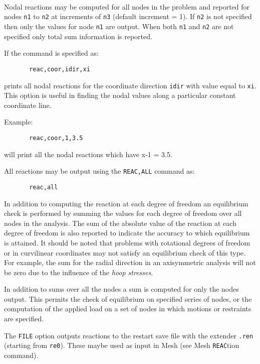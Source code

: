  \\{\smallskip}
 \\{\smallskip}
 \\{\smallskip}
\headb

Nodal reactions may be computed for all nodes in the
problem and reported for nodes {\tt n1} to {\tt n2} at increments
of {\tt n3} (default increment = 1).  If {\tt n2} is not specified then only
the values for node {\tt n1} are output.  When both {\tt n1} and {\tt n2}
are not specified only total sum information is reported.

If the command is specified as:
\begin{verbatim}
       reac,coor,idir,xi
\end{verbatim}
prints all nodal reactions for the coordinate direction
{\tt idir} with value equal to {\tt xi}.
This option is useful in finding the nodal values along a particular
constant coordinate line.

Example:
\begin{verbatim}
       reac,coor,1,3.5
\end{verbatim}
will print all the nodal reactions which have x-1 = 3.5.

All reactions may be output using the {\tt REAC,ALL} command as:
\begin{verbatim}
       reac,all
\end{verbatim}

In addition to computing the reaction at each degree of freedom
an equilibrium check is performed by summing the values for
each degree of freedom over all nodes in the analysis.  The
sum of the absolute value of the reaction at each degree of
freedom is also reported to indicate the accuracy to which
equilibrium is attained.  It should be noted that problems
with rotational degrees of freedom or in curvilinear coordinates
may not satisfy an equilibrium check of this type.
For example, the sum for the radial direction in an axisymmetric
analysis will not be zero due to the influence of the
{\it hoop stresses}.

In addition to sums over all the nodes a sum is computed
for only the nodes output.  This permits the check of
equilibrium on specified series of nodes, or the computation
of the applied load on a set of nodes in which motions or
restraints are specified.

The {\tt FILE} option outputs reactions to the restart save
file with the extender {\tt .ren} (starting from {\tt re0}).  These
maybe used as input in Mesh (see Mesh {\tt REAC}tion command).
\vfill\eject
